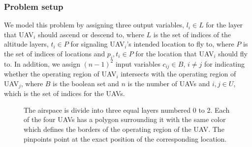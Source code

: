 \documentclass[]{article}
\begin{document}
\subsubsection{Problem setup}\label{problem-setup}
We model this problem by assigning three output variables, $l_{i} \in L$ for the layer 
that UAV$_{i}$ should ascend or descend to, where $L$ is the set of indices of the 
altitude layers, $t_{i} \in P$ for signaling UAV$_{i}$'s intended location to fly to, where $P$ 
is the set of indices of locations and $p_{i},t_{i} \in P$ for the location that UAV$_{i}$ should fly 
to. In addition, we assign $(n-1)^{2}$ input variables $c_{ij} \in B$, $i \neq j$ for indicating
whether the operating region of UAV$_{i}$ intersects with the operating region of
UAV$_{j}$, where $B$ is the boolean set and $n$ is the number of UAVs and $i,j \in U$, 
which is the set of indices for the UAVs.

\begin{figure}[htp]
    \label{fig:ca}
    \caption{The airspace is divide into three equal layers numbered 0 to 2. Each
of the four UAVs has a polygon surrounding it with the same color which defines
the borders of the operating region of the UAV. The pinpoints point at the exact 
position of the corresponding location.}
\end{figure}
\end{document}
